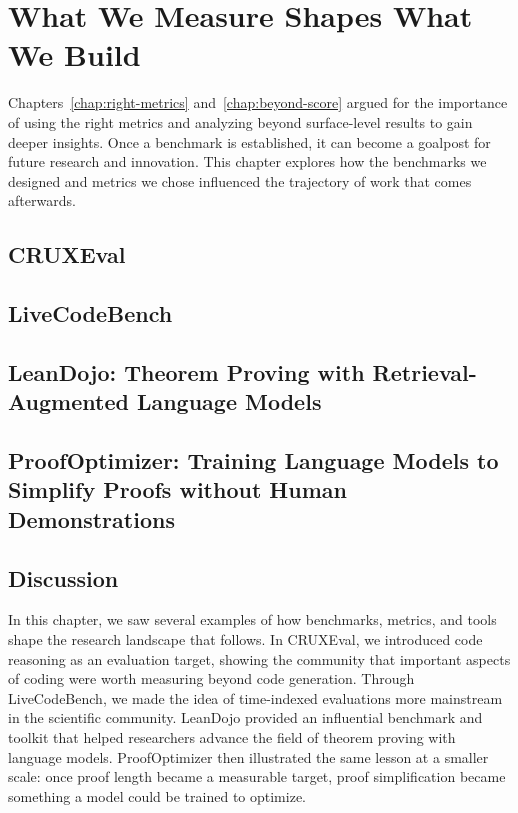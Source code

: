 \chapter{What We Measure Shapes What We Build}
\label{chap:measure-shapes}
Chapters~\ref{chap:right-metrics} and~\ref{chap:beyond-score} argued for the importance of
using the right metrics and analyzing beyond surface-level results to gain deeper insights.
Once a benchmark is established, it can become a goalpost for future research and innovation.
This chapter explores how the benchmarks we designed and metrics we chose influenced the trajectory of
work that comes afterwards.

\section{CRUXEval}
\label{sec:cruxeval-measure-shapes}



\section{LiveCodeBench}
\label{sec:livecodebench-measure-shapes}



\section[LeanDojo: Theorem Proving with Retrieval-Augmented Language Models]{LeanDojo: Theorem Proving with Retrieval-\texorpdfstring{\hspace{0pt}}{}Augmented Language Models}



\section{ProofOptimizer: Training Language Models to Simplify Proofs without Human Demonstrations}
\label{sec:proofoptimizer}


\section{Discussion}
In this chapter, we saw several examples of how benchmarks, metrics, and tools shape the
research landscape that follows. In CRUXEval, we introduced code reasoning as an evaluation target,
showing the community that important aspects of coding were worth measuring beyond code generation.
Through LiveCodeBench, we made the idea of time-indexed evaluations more mainstream in the scientific community.
LeanDojo provided an influential benchmark and toolkit that helped researchers advance
the field of theorem proving with language models. ProofOptimizer then illustrated the same
lesson at a smaller scale: once proof length became a measurable target, proof simplification
became something a model could be trained to optimize.

